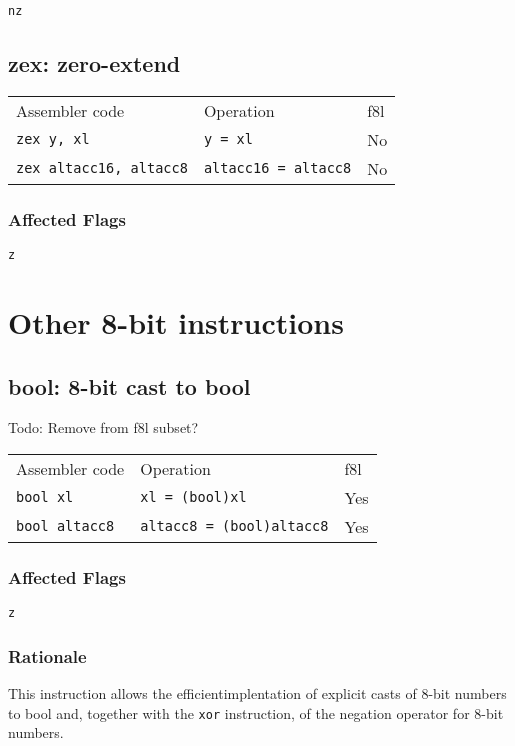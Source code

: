\documentclass{book}
\begin{document}
\texttt{nz}


\subsection{zex: zero-extend}

\begin{tabular}{l l l}
Assembler code                 & Operation                   & f8l \\
\texttt{zex y, xl}             & \texttt{y = xl}             & No \\
\texttt{zex altacc16, altacc8} & \texttt{altacc16 = altacc8} & No \\
\end{tabular}

\subsubsection*{Affected Flags}

\texttt{z}


\section{Other 8-bit instructions}

\subsection{bool: 8-bit cast to bool}

Todo: Remove from f8l subset?

\begin{tabular}{l l l}
Assembler code        & Operation                        & f8l \\
\texttt{bool xl}      & \texttt{xl = (bool)xl}           & Yes \\
\texttt{bool altacc8} & \texttt{altacc8 = (bool)altacc8} & Yes \\
\end{tabular}

\subsubsection*{Affected Flags}

\texttt{z}

\subsubsection*{Rationale}

This instruction allows the efficientimplentation of explicit casts of 8-bit numbers to bool and, together with the \texttt{xor} instruction, of the negation operator for 8-bit numbers.
\end{document}
